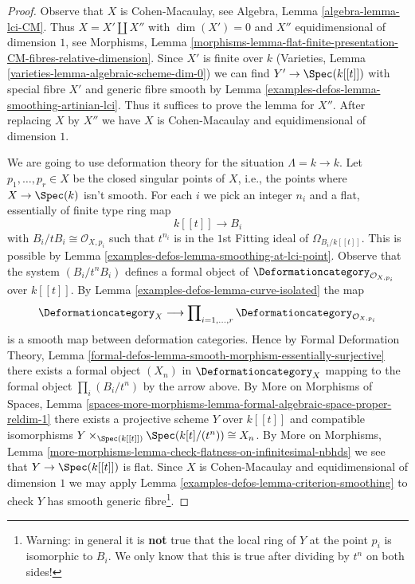 \begin{proof}
Observe that $X$ is Cohen-Macaulay, see
Algebra, Lemma \ref{algebra-lemma-lci-CM}.
Thus $X = X' \amalg X''$ with $\dim(X') = 0$
and $X''$ equidimensional of dimension $1$, see Morphisms, Lemma
\ref{morphisms-lemma-flat-finite-presentation-CM-fibres-relative-dimension}.
Since $X'$ is finite over $k$ (Varieties, Lemma
\ref{varieties-lemma-algebraic-scheme-dim-0})
we can find $Y' \to \Spec(k[[t]])$ with special
fibre $X'$ and generic fibre smooth by
Lemma \ref{examples-defos-lemma-smoothing-artinian-lci}.
Thus it suffices to prove the lemma for $X''$.
After replacing $X$ by $X''$ we have $X$ is
Cohen-Macaulay and equidimensional of dimension $1$.

\medskip\noindent
We are going to use deformation theory for the situation $\Lambda = k \to k$.
Let $p_1, \ldots, p_r \in X$ be the closed singular points of $X$, i.e.,
the points where $X \to \Spec(k)$ isn't smooth. For each $i$ we pick
an integer $n_i$ and a flat, essentially of finite type ring map
$$
k[[t]] \longrightarrow B_i
$$
with $B_i/tB_i \cong \mathcal{O}_{X, p_i}$ such that
$t^{n_i}$ is in the $1$st Fitting ideal of $\Omega_{B_i/k[[t]]}$.
This is possible by Lemma \ref{examples-defos-lemma-smoothing-at-lci-point}.
Observe that the system $(B_i/t^nB_i)$ defines a formal object of
$\Deformationcategory_{\mathcal{O}_{X, p_i}}$ over $k[[t]]$.
By Lemma \ref{examples-defos-lemma-curve-isolated} the map
$$
\Deformationcategory_X
\longrightarrow
\prod\nolimits_{i = 1, \ldots, r} \Deformationcategory_{\mathcal{O}_{X, p_i}}
$$
is a smooth map between deformation categories. Hence by
Formal Deformation Theory, Lemma
\ref{formal-defos-lemma-smooth-morphism-essentially-surjective}
there exists a formal object $(X_n)$ in $\Deformationcategory_X$
mapping to the formal object $\prod_i (B_i/t^n)$ by the arrow above.
By More on Morphisms of Spaces, Lemma
\ref{spaces-more-morphisms-lemma-formal-algebraic-space-proper-reldim-1}
there exists a projective scheme $Y$ over $k[[t]]$ and compatible
isomorphisms $Y \times_{\Spec(k[[t]])} \Spec(k[t]/(t^n)) \cong X_n$.
By More on Morphisms, Lemma
\ref{more-morphisms-lemma-check-flatness-on-infinitesimal-nbhds}
we see that $Y \to \Spec(k[[t]])$ is flat.
Since $X$ is Cohen-Macaulay and equidimensional of dimension $1$
we may apply Lemma \ref{examples-defos-lemma-criterion-smoothing}
to check $Y$ has smooth generic fibre\footnote{Warning: in general it is
{\bf not} true that the local ring of $Y$ at the point
$p_i$ is isomorphic to $B_i$. We only know that this is true after
dividing by $t^n$ on both sides!}.

\end{proof}
